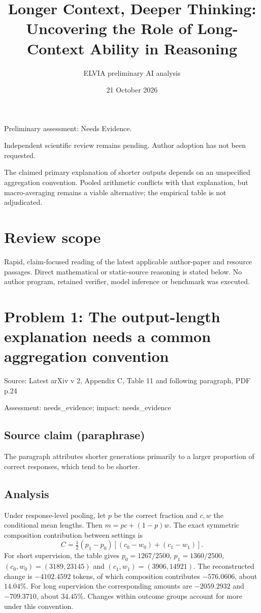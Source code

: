 \documentclass[11pt]{article}
\begin{document}
\title{Longer Context, Deeper Thinking: Uncovering the Role of Long-Context Ability in Reasoning}

\author{ELVIA preliminary AI analysis}\date{21 October 2026}\maketitle

Preliminary assessment: Needs Evidence.\par

Independent scientific review remains pending. Author adoption has not been requested.

The claimed primary explanation of shorter outputs depends on an unspecified aggregation convention. Pooled arithmetic conflicts with that explanation, but macro-averaging remains a viable alternative; the empirical table is not adjudicated.

\section*{Review scope}

Rapid, claim-focused reading of the latest applicable author-paper and resource passages. Direct mathematical or static-source reasoning is stated below. No author program, retained verifier, model inference or benchmark was executed.

\section*{Problem 1: The output-length explanation needs a common aggregation convention}

Source: Latest arXiv v 2, Appendix C, Table 11 and following paragraph, PDF p.24

Assessment: needs\_evidence; impact: needs\_evidence

\subsection*{Source claim (paraphrase)}

The paragraph attributes shorter generations primarily to a larger proportion of correct responses, which tend to be shorter.

\subsection*{Analysis}

Under response-level pooling, let \(p\) be the correct fraction and \(c,w\) the conditional mean lengths. Then \(m=pc+(1-p)w\). The exact symmetric composition contribution between settings is \[C=\tfrac12(p_1-p_0)[(c_0-w_0)+(c_1-w_1)].\] For short supervision, the table gives \(p_0=1267/2500\), \(p_1=1360/2500\), \((c_0,w_0)=(3189,23145)\) and \((c_1,w_1)=(3906,14921)\). The reconstructed change is \(-4102.4592\) tokens, of which composition contributes \(-576.0606\), about \(14.04\%\). For long supervision the corresponding amounts are \(-2059.2932\) and \(-709.3710\), about \(34.45\%\). Changes within outcome groups account for more under this convention.
\end{document}
